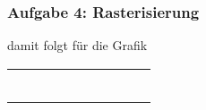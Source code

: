 \documentclass[accentcolor=tud9c,colorbacktitle,inverttitle,landscape,german,presentation,t]{tudbeamer}
\begin{document}
	\begin{frame}
	\frametitle{Aufgabe 4: Rasterisierung} 
	damit folgt für die Grafik \\
	\centering
	\begin{tabular}{|*{10}{c|}}
		\hline
		& & & & & & & & & \\ %
		\hline
		& & & & & & & & \cellcolor{black} & \\ %
		\hline
		& & & & & & \cellcolor{black} & \cellcolor{black} & & \\ %
		\hline
		& & & & \cellcolor{black} & \cellcolor{black} & & & & \\ %
		\hline
		& & \cellcolor{black} & \cellcolor{black} & & & & & & \\ %
		\hline
		& \cellcolor{black} & & & & & & & & \\ %
		\hline
		& & & & & & & & & \\ %
		\hline
	\end{tabular}
	\end{frame}
\end{document}
